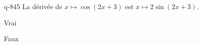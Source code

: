 \begin{truefalse}{q-845}
La dérivée de $x\mapsto \cos(2x+3)$ est $x\mapsto 2\sin(2x+3)$.
\item Vrai
\item* Faux
\end{truefalse}

